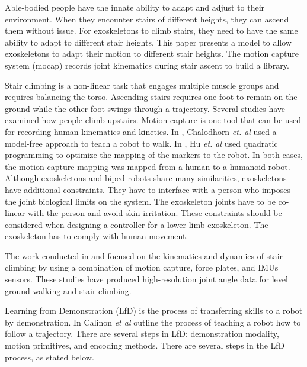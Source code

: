 Able-bodied people have the innate ability to adapt and adjust to their environment. When they encounter stairs of different heights, they can ascend them without issue. For exoskeletons to climb stairs, they need to have the same ability to adapt to different stair heights. This paper presents a model to allow exoskeletons to adapt their motion to different stair heights. The motion capture system (mocap) records joint kinematics during stair ascent to build a library.

Stair climbing is a non-linear task that engages multiple muscle groups and requires balancing the torso. Ascending stairs requires one foot to remain on the ground while the other foot swings through a trajectory\cite{hicks2012temporal}. Several studies have examined how people climb upstairs. Motion capture is one tool that can be used for recording human kinematics and kinetics. In  \cite{chalodhorn2007learning}, Chalodhorn \textit{et. al} used a model-free approach to teach a robot to walk.
In  \cite{hu2014online}, Hu \textit{et. al} used quadratic programming to optimize the mapping of the markers to the robot. In both cases, the motion capture mapping was mapped from a human to a humanoid robot. Although exoskeletons and biped robots share many similarities, exoskeletons have additional constraints. They have to interface with a person who imposes the joint biological limits on the system. The exoskeleton joints have to be co-linear with the person and avoid skin irritation. These constraints should be considered when designing a controller for a lower limb exoskeleton. The exoskeleton has to comply with human movement.

The work conducted in \cite{andriacchi1980study} and \cite{hicks2011lower} focused on the kinematics and dynamics of stair climbing by using a combination of motion capture, force plates, and IMUs sensors. These studies have produced high-resolution joint angle data for level ground walking and stair climbing.


Learning from Demonstration (LfD) is the process of transferring skills to a robot by demonstration. In \cite{siciliano2016springer}  \cite{kormushev2011imitation} \cite{calinon2007teacher} Calinon \textit{et al} outline the process of teaching a robot how to follow a trajectory. There are several steps in LfD: demonstration modality, motion primitives, and encoding methods. There are several steps in the LfD process, as stated below. 

